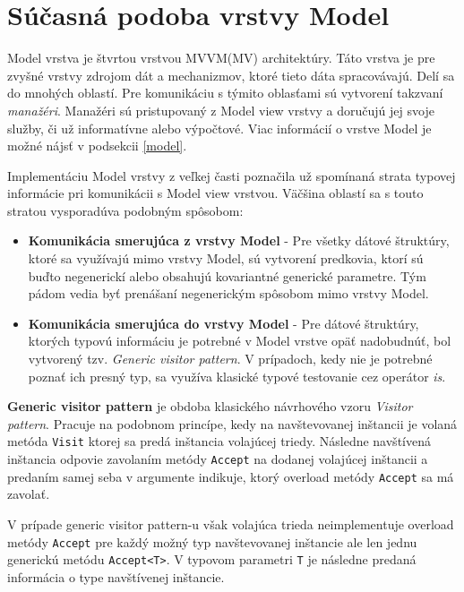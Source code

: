 \chapter{Súčasná podoba vrstvy Model}\label{architektura_model_vrstvy}

Model vrstva je štvrtou vrstvou MVVM(MV) architektúry. Táto vrstva je pre zvyšné vrstvy zdrojom dát a mechanizmov, ktoré tieto dáta spracovávajú. Delí sa do mnohých oblastí. Pre komunikáciu s týmito oblasťami sú vytvorení takzvaní \textit{manažéri}. Manažéri sú pristupovaný z Model view vrstvy a doručujú jej svoje služby, či už informatívne alebo výpočtové. Viac informácií o vrstve Model je možné nájsť v podsekcii \ref{model}.

Implementáciu Model vrstvy z veľkej časti poznačila už spomínaná strata typovej informácie pri komunikácii s Model view vrstvou. Väčšina oblastí sa s touto stratou vysporadúva podobným spôsobom:
\begin{itemize}
    \item \textbf{Komunikácia smerujúca z vrstvy Model} - Pre všetky dátové štruktúry, ktoré sa využívajú mimo vrstvy Model, sú vytvorení predkovia, ktorí sú buďto negenerickí alebo obsahujú kovariantné generické parametre. Tým pádom vedia byť prenášaní negenerickým spôsobom mimo vrstvy Model.
    \item \textbf{Komunikácia smerujúca do vrstvy Model} - Pre dátové štruktúry, ktorých typovú informáciu je potrebné v Model vrstve opäť nadobudnúť, bol vytvorený tzv. \textit{Generic visitor pattern}. V prípadoch, kedy nie je potrebné poznať ich presný typ, sa využíva klasické typové testovanie cez operátor \textit{is}.
\end{itemize} 

\begin{definice}
    \textbf{Generic visitor pattern} je obdoba klasického návrhového vzoru \emph{Visitor pattern}. Pracuje na podobnom princípe, kedy na navštevovanej inštancii je volaná metóda \texttt{Visit} ktorej sa predá inštancia volajúcej triedy. Následne navštívená inštancia odpovie zavolaním metódy \texttt{Accept} na dodanej volajúcej inštancii a predaním samej seba v argumente indikuje, ktorý overload metódy \texttt{Accept} sa má zavolať.

    V prípade generic visitor pattern-u však volajúca trieda neimplementuje overload metódy \texttt{Accept} pre každý možný typ navštevovanej inštancie ale len jednu generickú metódu \texttt{Accept<T>}. V typovom parametri \texttt{T} je následne predaná informácia o type navštívenej inštancie.
\end{definice}

